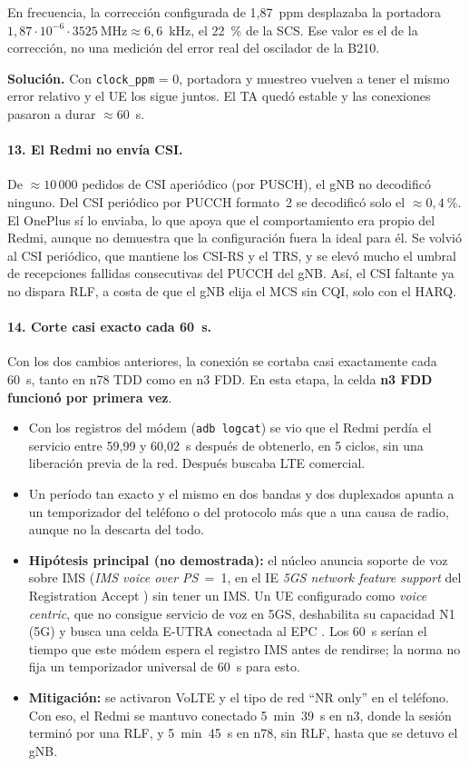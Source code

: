 En frecuencia, la corrección configurada de 1,87~ppm desplazaba la portadora $1{,}87\cdot 10^{-6}\cdot 3525~\text{MHz}\approx 6{,}6$~kHz, el 22~\% de la SCS. Ese valor es el de la corrección, no una medición del error real del oscilador de la B210.

\textbf{Solución.} Con \texttt{clock\_ppm} = 0, portadora y muestreo vuelven a tener el mismo error relativo y el UE los sigue juntos. El TA quedó estable y las conexiones pasaron a durar $\approx 60$~s.

\paragraph{13. El Redmi no envía CSI.} De $\approx 10\,000$ pedidos de CSI aperiódico (por PUSCH), el gNB no decodificó ninguno. Del CSI periódico por PUCCH formato~2 se decodificó solo el $\approx 0{,}4~\%$. El OnePlus sí lo enviaba, lo que apoya que el comportamiento era propio del Redmi, aunque no demuestra que la configuración fuera la ideal para él. Se volvió al CSI periódico, que mantiene los CSI-RS y el TRS, y se elevó mucho el umbral de recepciones fallidas consecutivas del PUCCH del gNB. Así, el CSI faltante ya no dispara RLF, a costa de que el gNB elija el MCS sin CQI, solo con el HARQ.

\paragraph{14. Corte casi exacto cada 60~s.} Con los dos cambios anteriores, la conexión se cortaba casi exactamente cada 60~s, tanto en n78 TDD como en n3 FDD. En esta etapa, la celda \textbf{n3 FDD funcionó por primera vez}.
\begin{itemize}
  \item Con los registros del módem (\texttt{adb logcat}) se vio que el Redmi perdía el servicio entre 59,99 y 60,02~s después de obtenerlo, en 5 ciclos, sin una liberación previa de la red. Después buscaba LTE comercial.
  \item Un período tan exacto y el mismo en dos bandas y dos duplexados apunta a un temporizador del teléfono o del protocolo más que a una causa de radio, aunque no la descarta del todo.
  \item \textbf{Hipótesis principal (no demostrada):} el núcleo anuncia soporte de voz sobre IMS (\emph{IMS voice over PS}~=~1, en el IE \emph{5GS network feature support} del Registration Accept \cite[§9.11.3.5]{ts24501}) sin tener un IMS. Un UE configurado como \emph{voice centric}, que no consigue servicio de voz en 5GS, deshabilita su capacidad N1 (5G) y busca una celda E-UTRA conectada al EPC \cite[§4.3.2]{ts24501}. Los 60~s serían el tiempo que este módem espera el registro IMS antes de rendirse; la norma no fija un temporizador universal de 60~s para esto.
  \item \textbf{Mitigación:} se activaron VoLTE y el tipo de red ``NR only'' en el teléfono. Con eso, el Redmi se mantuvo conectado 5~min~39~s en n3, donde la sesión terminó por una RLF, y 5~min~45~s en n78, sin RLF, hasta que se detuvo el gNB.
\end{itemize}

